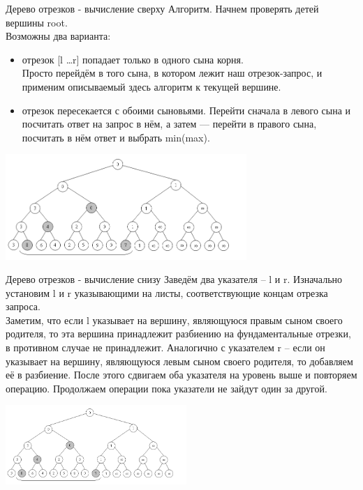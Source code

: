\documentclass[10pt]{beamer}
\begin{document}
\begin{frame}[fragile]{Дерево отрезков - вычисление сверху}
Алгоритм. Начнем проверять детей вершины root. \\
Возможны два варианта: 
\begin{itemize}
    \item отрезок [l \ldots r] попадает только в одного сына корня.\\
    Просто перейдём в того сына, в котором лежит наш отрезок-запрос, и применим описываемый здесь алгоритм к текущей вершине.
    \item отрезок пересекается с обоими сыновьями. Перейти сначала в левого сына и посчитать ответ на запрос в нём, а затем — перейти в правого сына, посчитать в нём ответ и выбрать min(max).
\end{itemize}
\begin{center}
    \includegraphics[height=4cm]{Term_2/Source/images/9-segment-tree-1.png}
\end{center}
\end{frame}

\begin{frame}[fragile]{Дерево отрезков - вычисление снизу}
Заведём два указателя – l и r. Изначально установим l и r указывающими на листы, соответствующие концам отрезка запроса. \\
Заметим, что если l указывает на вершину, являющуюся правым сыном своего родителя, то эта вершина принадлежит разбиению на фундаментальные отрезки, в противном случае не принадлежит. Аналогично с указателем r – если он указывает на вершину, являющуюся левым сыном своего родителя, то добавляем её в разбиение. После этого сдвигаем оба указателя на уровень выше и повторяем операцию. Продолжаем операции пока указатели не зайдут один за другой.
\begin{center}
    \includegraphics[height=3cm]{Term_2/Source/images/9-segment-tree-1.png}
\end{center}
\end{frame}
\end{document}
